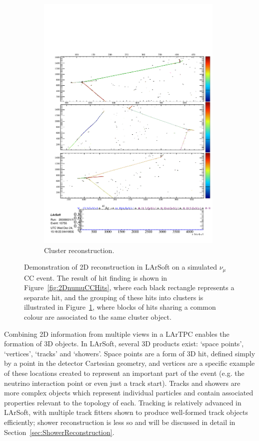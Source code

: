 \begin{figure}
\begin{subfigure}[t]{0.48\linewidth}
    \includegraphics[width=0.98\textwidth]{2DnumuCCClusters.pdf}
    \caption{Cluster reconstruction.}
    \label{fig:2DnumuCCClusters}
  \end{subfigure}
  \caption[Demonstration of 2D reconstruction in LArSoft on a simulated $\nu_{\mu}$CC event.]{Demonstration of 2D reconstruction in LArSoft on a simulated $\nu_{\mu}$CC event.  The result of hit finding is shown in Figure~\ref{fig:2DnumuCCHits}, where each black rectangle represents a separate hit, and the grouping of these hits into clusters is illustrated in Figure~\ref{fig:2DnumuCCClusters}, where blocks of hits sharing a common colour are associated to the same cluster object.}
  \label{fig:2DnumuCC}
\end{figure}

Combining 2D information from multiple views in a LArTPC enables the formation of 3D objects.  In LArSoft, several 3D products exist: `space points', `vertices', `tracks' and `showers'.  Space points are a form of 3D hit, defined simply by a point in the detector Cartesian geometry, and vertices are a specific example of these locations created to represent an important part of the event (e.g. the neutrino interaction point or even just a track start).  Tracks and showers are more complex objects which represent individual particles and contain associated properties relevant to the topology of each.  Tracking is relatively advanced in LArSoft, with multiple track fitters shown to produce well-formed track objects efficiently; shower reconstruction is less so and will be discussed in detail in Section~\ref{sec:ShowerReconstruction}.

